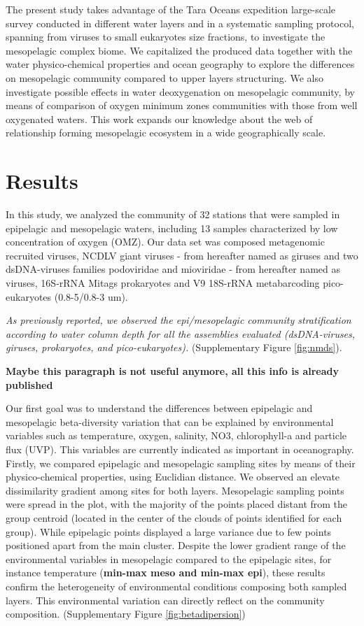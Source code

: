 \documentclass[fleqn,10pt]{wlscirep}
\begin{document}
The present study takes advantage of the Tara Oceans expedition large-scale survey conducted in different water layers and in a systematic sampling protocol, spanning from viruses to small eukaryotes size fractions, to investigate the mesopelagic complex biome. We capitalized the produced data together with the water physico-chemical properties and ocean geography to explore the differences on mesopelagic community compared to upper layers structuring. We also investigate possible effects in water deoxygenation on mesopelagic community, by means of comparison of oxygen minimum zones communities with those from well oxygenated waters. This work expands our knowledge about the web of relationship forming mesopelagic ecosystem in a wide geographically scale.

\section*{Results}

In this study, we analyzed the community of 32 stations that were sampled in epipelagic and mesopelagic waters, including 13 samples characterized by low concentration of oxygen (OMZ). Our data set was composed metagenomic recruited viruses, NCDLV giant viruses - from hereafter named as giruses and two dsDNA-viruses families podoviridae and mioviridae - from hereafter named as viruses, 16S-rRNA Mitags prokaryotes and V9 18S-rRNA metabarcoding pico-eukaryotes (0.8-5/0.8-3 um).

\textit{As previously reported, we observed the epi/mesopelagic community stratification according to water column depth for all the assemblies evaluated (dsDNA-viruses, giruses, prokaryotes, and pico-eukaryotes).}  (Supplementary Figure \ref{fig:nmds}).


\textbf{Maybe this paragraph is not useful anymore, all this info is already published}


Our first goal was to understand the differences between epipelagic and mesopelagic beta-diversity variation that can be explained by environmental variables such as temperature, oxygen, salinity, NO3, chlorophyll-a and particle flux (UVP). This variables are currently indicated as important in oceanography. Firstly, we compared epipelagic and mesopelagic sampling sites by means of their physico-chemical properties, using Euclidian distance. We observed an elevate dissimilarity gradient among sites for both layers. Mesopelagic sampling points were spread in the plot, with the majority of the points placed distant from the group centroid (located in the center of the clouds of points identified for each group). While epipelagic points displayed a large variance due to few points positioned apart from the main cluster. Despite the lower gradient range of the environmental variables in mesopelagic compared to the epipelagic sites, for instance temperature (\textbf{min-max meso and min-max epi}), these results confirm the heterogeneity of environmental conditions composing both sampled layers. This environmental variation can directly reflect on the community composition.  (Supplementary Figure \ref{fig:betadipersion})
\end{document}
